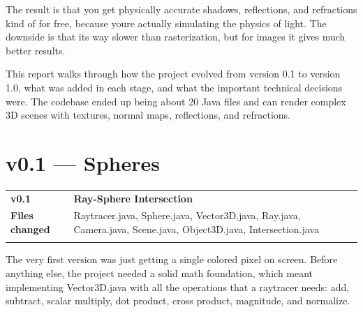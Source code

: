 \documentclass[
]{article}
\newcounter{none} %
\begin{document}
The result is that you get physically accurate shadows, reflections, and
refractions kind of for free, because you\textquotesingle re actually
simulating the physics of light. The downside is that
it\textquotesingle s way slower than rasterization, but for images it
gives much better results.

This report walks through how the project evolved from version 0.1 to
version 1.0, what was added in each stage, and what the important
technical decisions were. The codebase ended up being about 20 Java
files and can render complex 3D scenes with textures, normal maps,
reflections, and refractions.

\section{\texorpdfstring{\textbf{v0.1 ---
Spheres}}{v0.1 --- Spheres}}\label{v0.1-spheres}

{\def\LTcaptype{none} %
\begin{longtable}[]{@{}
  >{\raggedright\arraybackslash}p{}
  >{\raggedright\arraybackslash}p{}@{}}
\toprule\noalign{}
\begin{minipage}[b]{\linewidth}\raggedright
\textbf{v0.1}
\end{minipage} & \begin{minipage}[b]{\linewidth}\raggedright
\textbf{Ray-Sphere Intersection}
\end{minipage} \\
\begin{minipage}[b]{\linewidth}\raggedright
\textbf{Files changed}
\end{minipage} & \begin{minipage}[b]{\linewidth}\raggedright
Raytracer.java, Sphere.java, Vector3D.java, Ray.java, Camera.java,
Scene.java, Object3D.java, Intersection.java
\end{minipage} \\
\midrule\noalign{}
\endhead
\bottomrule\noalign{}
\endlastfoot
\end{longtable}
}

The very first version was just getting a single colored pixel on
screen. Before anything else, the project needed a solid math
foundation, which meant implementing Vector3D.java with all the
operations that a raytracer needs: add, subtract, scalar multiply, dot
product, cross product, magnitude, and normalize.
\end{document}
